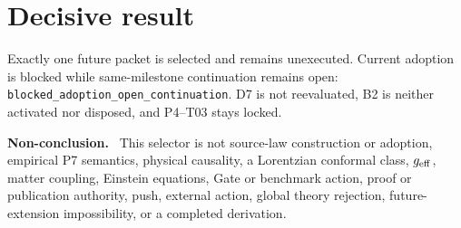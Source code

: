 \documentclass[11pt]{article}
\newenvironment{nonconclusion}{\par\smallskip\noindent\textbf{Non-conclusion.}\ }{\par\smallskip}
\begin{document}
\section{Decisive result}

Exactly one future packet is selected and remains unexecuted.  Current
adoption is blocked while same-milestone continuation remains open:
\nolinkurl{blocked_adoption_open_continuation}.  D7 is not reevaluated, B2 is
neither activated nor disposed, and P4--T03 stays locked.

\begin{nonconclusion}
This selector is not source-law construction or adoption, empirical P7
semantics, physical causality, a Lorentzian conformal class, $g_{\rm eff}$,
matter coupling, Einstein equations, Gate or benchmark action, proof or
publication authority, push, external action, global theory rejection,
future-extension impossibility, or a completed derivation.
\end{nonconclusion}
\end{document}
